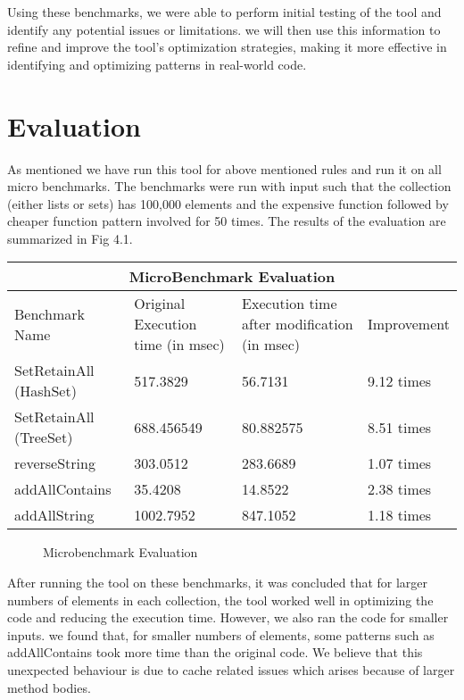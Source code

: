 Using these benchmarks, we were able to perform initial testing of the tool and identify any potential issues or limitations. we will then use this information to refine and improve the tool's optimization strategies, making it more effective in identifying and optimizing patterns in real-world code.


\section{Evaluation}
As mentioned we have run this tool for above mentioned rules and run it on all micro benchmarks. The benchmarks were run with input such that the collection (either lists or sets) has 100,000 elements and the expensive function followed by cheaper function pattern involved for 50 times. The results of the evaluation are summarized in Fig 4.1.

\begin{tabular}{ |p{3cm}|p{4cm}|p{4cm}|p{3cm}|  }
\hline
\multicolumn{4}{|c|}{MicroBenchmark Evaluation} \\
\hline
Benchmark Name & Original Execution time (in msec) & Execution time after modification (in msec) & Improvement \\
\hline
SetRetainAll (HashSet) &517.3829 & 56.7131 & 9.12 times \\
SetRetainAll (TreeSet) &688.456549 & 80.882575 & 8.51 times \\
reverseString &303.0512 & 283.6689 & 1.07 times \\
addAllContains &35.4208 & 14.8522 & 2.38 times \\
addAllString    &1002.7952 & 847.1052 & 1.18 times \\
\hline
\end{tabular}

\begin{figure} [h]
    \centering
    \caption{Microbenchmark Evaluation}
    \label{fig:my_label}
\end{figure}

After running the tool on these benchmarks, it was concluded that for larger numbers of elements in each collection, the tool worked well in optimizing the code and reducing the execution time. However, we also ran the code for smaller inputs. we found that, for smaller numbers of elements, some patterns such as addAllContains took more time than the original code. We believe that this unexpected behaviour is due to cache related issues which arises because of larger method bodies.


